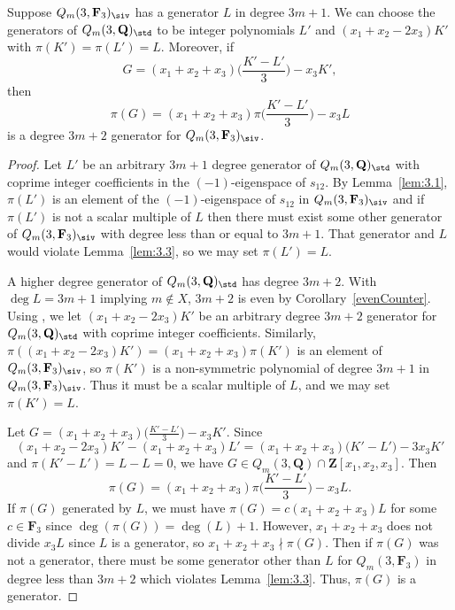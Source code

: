 \begin{Lemma}\label{3m+2}
 Suppose $Q_m(3,\mathbf{F}_3)_{\siv}$ has a generator $L$ in degree $3m+1$. We can choose the generators of $Q_m(3,\mathbf{Q})_{\std}$ to be integer polynomials $L'$ and $(x_1+x_2-2x_3)K'$ with $\pi(K')=\pi(L')=L$. Moreover, if
 \[G=(x_1+x_2+x_3)\biggl(\frac{K'-L'}{3}\biggr)-x_3K',\]
 then
 \[\pi(G)= (x_1+x_2+x_3)\pi\biggl(\frac{K'-L'}{3}\biggr)-x_3L\]
 is a degree $3m+2$ generator for $Q_m(3,\mathbf{F}_3)_{\siv}$.
\end{Lemma}
\begin{proof}
 Let $L'$ be an arbitrary $3m+1$ degree generator of $Q_m(3,\mathbf{Q})_{\std}$ with coprime integer coefficients in the $(-1)$-eigenspace of $s_{12}$. By Lemma~\ref{lem:3.1}, $\pi(L')$ is an element of the $(-1)$-eigenspace of $s_{12}$ in $Q_m(3,\mathbf{F}_3)_{\siv}$ and if $\pi(L')$ is not a scalar multiple of $L$ then there must exist some other generator of $Q_m(3,\mathbf{F}_3)_{\siv}$ with degree less than or equal to $3m+1$. That generator and $L$ would violate Lemma~\ref{lem:3.3}, so we may set $\pi(L')=L$.

 A higher degree generator of $Q_m(3,\mathbf{Q})_{\std}$ has degree $3m+2$. With $\deg L=3m+1$ implying $m\not\in X$, $3m+2$ is even by Corollary~\ref{evenCounter}. Using \cite{wang2022explicit}, we let $(x_1+x_2-2x_3)K'$ be an arbitrary degree $3m+2$ generator for $Q_m(3,\mathbf{Q})_{\std}$ with coprime integer coefficients. Similarly, $\pi((x_1+x_2-2x_3)K')= (x_1+x_2+x_3)\pi(K')$ is an element of $Q_m(3,\mathbf{F}_3)_{\siv}$, so $\pi(K')$ is a non-symmetric polynomial of degree $3m+1$ in $Q_m(3,\mathbf{F}_3)_\siv$. Thus it must be a scalar multiple of $L$, and we may set $\pi(K')=L$.

 Let $G=(x_1+x_2+x_3)\big(\frac{K'-L'}{3}\big)-x_3K'$. Since
 \[(x_1+x_2-2x_3)K'-(x_1+x_2+x_3)L' = (x_1+x_2+x_3)\big(K'-L'\big)-3x_3K'\]
 and $\pi(K'-L')=L-L=0$, we have $G\in Q_m(3,\mathbf{Q})\cap \mathbf{Z}[x_1,x_2,x_3]$. Then
 \[\pi(G)= (x_1+x_2+x_3)\pi\biggl(\frac{K'-L'}{3}\biggr)-x_3L.\]
 If $\pi(G)$ generated by $L$, we must have $\pi(G)=c(x_1+x_2+x_3)L$ for some $c\in \mathbf{F}_3$ since $\deg\left(\pi(G)\right)=\deg(L)+1$. However, $x_1+x_2+x_3$ does not divide $x_3L$ since $L$ is a generator, so $x_1+x_2+x_3\nmid \pi(G)$. Then if $\pi(G)$ was not a generator, there must be some generator other than $L$ for $Q_m(3,\mathbf{F}_3)$ in degree less than $3m+2$ which violates Lemma~\ref{lem:3.3}. Thus, $\pi(G)$ is a generator.
\end{proof}

